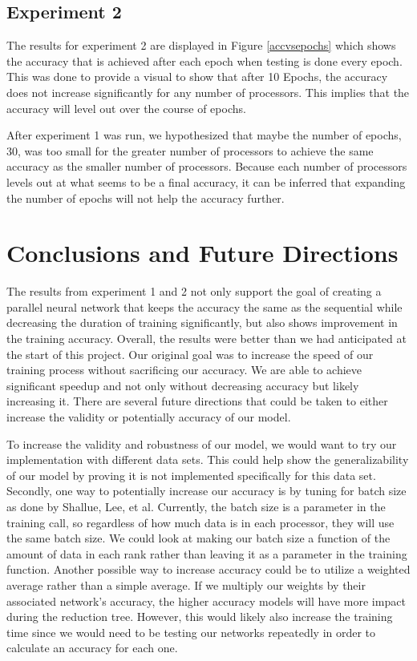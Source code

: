 \documentclass[11pt,twocolumn]{article}
\begin{document}
\subsection{Experiment 2}

The results for experiment 2 are displayed in Figure \ref{accvsepochs} which shows the accuracy that is achieved after each epoch when testing is done every epoch. This was done to provide a visual to show that after 10 Epochs, the accuracy does not increase significantly for any number of processors. This implies that the accuracy will level out over the course of epochs.

After experiment 1 was run, we hypothesized that maybe the number of epochs, 30, was too small for the greater number of processors to achieve the same accuracy as the smaller number of processors. Because each number of processors levels out at what seems to be a final accuracy, it can be inferred that expanding the number of epochs will not help the accuracy further. 


\section{Conclusions and Future Directions}\label{conc} 


The results from experiment 1 and 2 not only support the goal of creating a parallel neural network that keeps the accuracy the same as the sequential while decreasing the duration of training significantly, but also shows improvement in the training accuracy. Overall, the results were better than we had anticipated at the start of this project. Our original goal was to increase the speed of our training process without sacrificing our accuracy. We are able to achieve significant speedup and not only without decreasing accuracy but likely increasing it. There are several future directions that could be taken to either increase the validity or potentially accuracy of our model. 

To increase the validity and robustness of our model, we would want to try our implementation with different data sets. This could help show the generalizability of our model by proving it is not implemented specifically for this data set. Secondly, one way to potentially increase our accuracy is by tuning for batch size as done by Shallue, Lee, et al\cite{Shallue:NNTraining}. Currently, the batch size is a parameter in the training call, so regardless of how much data is in each processor, they will use the same batch size. We could look at making our batch size a function of the amount of data in each rank rather than leaving it as a parameter in the training function. Another possible way to increase accuracy could be to utilize a weighted average rather than a simple average. If we multiply our weights by their associated network's accuracy, the higher accuracy models will have more impact during the reduction tree. However, this would likely also increase the training time since we would need to be testing our networks repeatedly in order to calculate an accuracy for each one.
\end{document}
